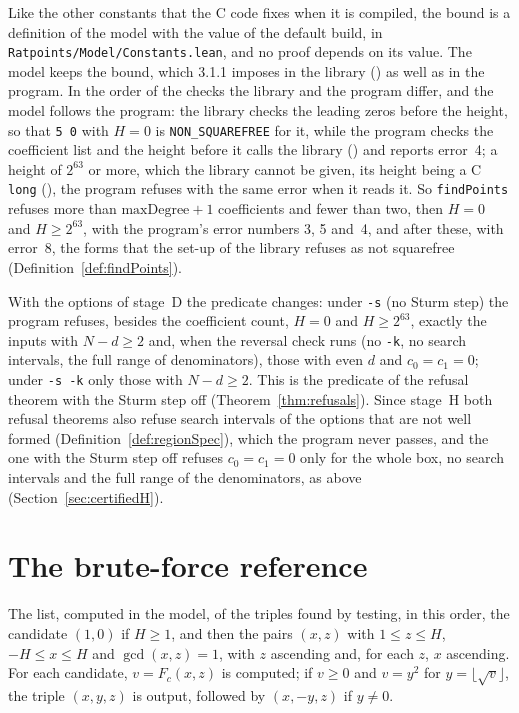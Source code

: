 Like the other constants that the C code fixes when it is compiled, the bound is a definition of the
model with the value of the default build, in \verb|Ratpoints/Model/Constants.lean|, and no proof
depends on its value. The model keeps the bound, which 3.1.1 imposes in the library
() as well as in the program. In the order of the checks the
library and the program differ, and the model follows the program: the library checks the leading
zeros before the height, so that \verb|5 0| with $H = 0$ is \verb|NON_SQUAREFREE| for it, while the
program checks the coefficient list and the height before it calls the library
() and reports error~4; a height of $2^{63}$ or more, which the library
cannot be given, its height being a C \verb|long| (), the program
refuses with the same error when it reads it. So \verb|findPoints| refuses more than
$\mathrm{maxDegree} + 1$ coefficients and fewer than two, then $H = 0$ and $H \ge 2^{63}$, with the
program's error numbers 3, 5 and~4, and after these, with error~8, the forms that the set-up of the
library refuses as not squarefree (Definition~\ref{def:findPoints}).

With the options of stage~D the predicate changes: under \verb|-s| (no Sturm step) the program
refuses, besides the coefficient count, $H = 0$ and $H \ge 2^{63}$, exactly the inputs with
$N - d \ge 2$ and, when the reversal check runs (no \verb|-k|, no search intervals, the full range
of denominators), those with even $d$ and $c_0 = c_1 = 0$; under \verb|-s -k| only those with
$N - d \ge 2$. This is the predicate of the refusal theorem with the Sturm step off
(Theorem~\ref{thm:refusals}). Since stage~H both refusal theorems also refuse search intervals of
the options that are not well formed (Definition~\ref{def:regionSpec}), which the program never
passes, and the one with the Sturm step off refuses $c_0 = c_1 = 0$ only for the whole box, no
search intervals and the full range of the denominators, as above (Section~\ref{sec:certifiedH}).

\section{The brute-force reference}\label{sec:bruteForce}

\begin{definition}\label{def:bruteForce}
  \leanok
  The list, computed in the model, of the triples found by testing, in this order, the candidate
  $(1, 0)$ if $H \ge 1$, and then the pairs $(x, z)$ with $1 \le z \le H$, $-H \le x \le H$ and
  $\gcd(x, z) = 1$, with $z$ ascending and, for each $z$, $x$ ascending. For each candidate, $v =
  F_c(x, z)$ is computed; if $v \ge 0$ and $v = y^2$ for $y = \lfloor \sqrt{v} \rfloor$, the triple
  $(x, y, z)$ is output, followed by $(x, -y, z)$ if $y \ne 0$.
\end{definition}

